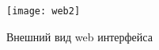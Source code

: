 \begin{figure}[h]
	\centering
	\texttt{[image: web2]}
	\caption{Внешний вид web интерфейса}
	\label{fig:web2}
\end{figure}





%
%





